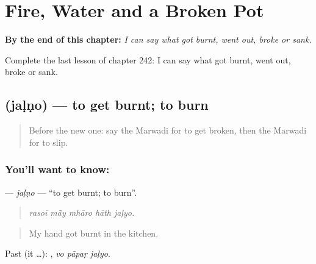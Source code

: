 
\chapter{Fire, Water and a Broken Pot}
\label{ch:mw-fire-water-and-a-broken-pot}

\begin{chapteropening}
\textbf{By the end of this chapter:} \emph{I can say what got burnt, went out, broke or sank.}

Complete the last lesson of chapter 242: I can say what got burnt, went out, broke or sank.
\end{chapteropening}

\section[\texorpdfstring{\mw{जळणो} (jaḷṇo)}{जळणो (jaḷṇo)}]{ (jaḷṇo) — to get burnt; to burn}

\label{lesson:MW-C242-jalno}



\begin{quote}
Before the new one: say the Marwadi for to get broken, then the Marwadi for to slip.
\end{quote}

\subsection*{You'll want to know: }
\textbf{} — \emph{jaḷṇo} — \textquotedblleft{}to get burnt; to burn\textquotedblright{}.

\begin{quote}
    
\end{quote}

\begin{quote}
\emph{rasoī mā̃y mhāro hāth jaḷyo.}
\end{quote}

\begin{quote}
My hand got burnt in the kitchen.
\end{quote}

Past (it …):   , \emph{vo pāpaṛ jaḷyo}.

